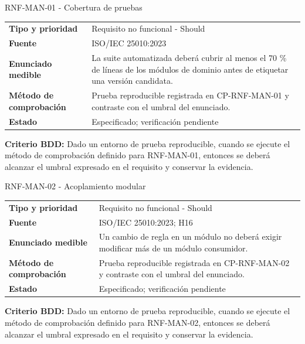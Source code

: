 \documentclass[11pt,a4paper]{article}
\begin{document}
\begin{reqbox}[colframe=Teal]{RNF-MAN-01 - Cobertura de pruebas}
\begin{tabularx}{\textwidth}{>{\bfseries}p{3.2cm}Y}
Tipo y prioridad & Requisito no funcional - Should \\
Fuente & ISO/IEC 25010:2023 \\
Enunciado medible & La suite automatizada deberá cubrir al menos el 70 \% de líneas de los módulos de dominio antes de etiquetar una versión candidata. \\
Método de comprobación & Prueba reproducible registrada en CP-RNF-MAN-01 y contraste con el umbral del enunciado. \\
Estado & Especificado; verificación pendiente \\
\end{tabularx}
\textbf{Criterio BDD:} Dado un entorno de prueba reproducible, cuando se ejecute el método de comprobación definido para RNF-MAN-01, entonces se deberá alcanzar el umbral expresado en el requisito y conservar la evidencia.
\end{reqbox}


\begin{reqbox}[colframe=Teal]{RNF-MAN-02 - Acoplamiento modular}
\begin{tabularx}{\textwidth}{>{\bfseries}p{3.2cm}Y}
Tipo y prioridad & Requisito no funcional - Should \\
Fuente & ISO/IEC 25010:2023; H16 \\
Enunciado medible & Un cambio de regla en un módulo no deberá exigir modificar más de un módulo consumidor. \\
Método de comprobación & Prueba reproducible registrada en CP-RNF-MAN-02 y contraste con el umbral del enunciado. \\
Estado & Especificado; verificación pendiente \\
\end{tabularx}
\textbf{Criterio BDD:} Dado un entorno de prueba reproducible, cuando se ejecute el método de comprobación definido para RNF-MAN-02, entonces se deberá alcanzar el umbral expresado en el requisito y conservar la evidencia.
\end{reqbox}
\end{document}
